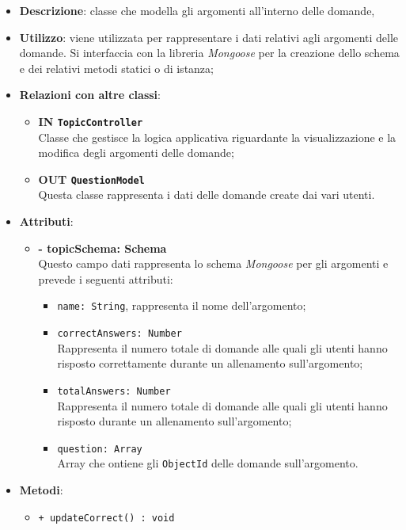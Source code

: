 \begin{itemize}
	\item \textbf{Descrizione}: classe che modella gli argomenti all'interno delle domande,
	\item \textbf{Utilizzo}:	viene utilizzata per rappresentare i dati relativi agli argomenti delle domande. Si interfaccia con la libreria \textit{Mongoose} per la creazione dello schema e dei relativi metodi statici o di istanza;
	\item \textbf{Relazioni con altre classi}:
		\begin{itemize}
			\item \textbf{IN \texttt{TopicController}} \\
			Classe che gestisce la logica applicativa riguardante la visualizzazione e la modifica degli argomenti delle domande;
			\item \textbf{OUT \texttt{QuestionModel}} \\
			Questa classe rappresenta i dati delle domande create dai vari utenti.
		\end{itemize}
	\item \textbf{Attributi}:
		\begin{itemize}
			\item \textbf{- topicSchema: Schema} \\
			Questo campo dati rappresenta lo schema \textit{Mongoose} per gli argomenti e prevede i seguenti attributi:
				\begin{itemize}
					\item \texttt{name: String}, rappresenta il nome dell'argomento;
					\item \texttt{correctAnswers: Number}\\ Rappresenta il numero totale di domande alle quali gli utenti hanno risposto correttamente durante un allenamento sull'argomento; 
					\item \texttt{totalAnswers: Number}\\ Rappresenta il numero totale di domande alle quali gli utenti hanno risposto durante un allenamento sull'argomento;
					\item \texttt{question: Array}\\ Array che ontiene gli \texttt{ObjectId} delle domande sull'argomento.
				\end{itemize}
		\end{itemize}
	\item \textbf{Metodi}:
		\begin{itemize}
			\item \texttt{+ updateCorrect() : void} \\

\end{itemize}
\end{itemize}
